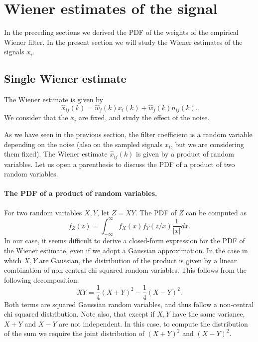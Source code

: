 \documentclass[a4paper,10pt]{article}
\begin{document}
\section{Wiener estimates of the signal}

In the preceding sections we derived the PDF of
the weights of the empirical Wiener filter.
In the present section we will study the Wiener estimates of the signals $x_i$.

\subsection{Single Wiener estimate}

The Wiener estimate is given by
\[\hat x_{ij}(k) = \hat w_j(k) x_i(k) + \hat w_j(k)n_{ij}(k).\]
We consider that the $x_i$ are fixed, and study the effect of the noise.

As we have seen in the previous section, the filter coefficient is a random
variable depending on the noise (also on the sampled signals $x_i$, but we
are considering them fixed). The Wiener estimate $\hat x_{ij}(k)$ is given
by a product of random variables. Let us open a parenthesis to discuss the
PDF of a product of two random variables.

\paragraph{The PDF of a product of random variables.}
For two random variables $X,Y$, let $Z = XY$. The PDF of $Z$ can be computed as
\[f_Z(z) = \int_{-\infty}^{\infty} f_X(x)f_Y(z/x)\frac1{|x|}d x.\]
In our case, it seems difficult to derive a closed-form expression for the PDF
of the Wiener estimate, even if we adopt a Gaussian approximation. In the case
in which $X,Y$ are Gaussian, the distribution of the product is given by a 
linear combination of non-central chi squared random variables. This follows
from the following decomposition:
\[XY = \frac14(X + Y)^2 - \frac14(X-Y)^2.\]
Both terms are squared Gaussian random variables, and thus follow a non-central
chi squared distribution. Note also, that except if $X,Y$ have the same variance,
$X+Y$ and $X-Y$ are not independent. In this case, to compute the distribution of
the sum we require the joint distribution of $(X+Y)^2$ and $(X-Y)^2$.
\end{document}
